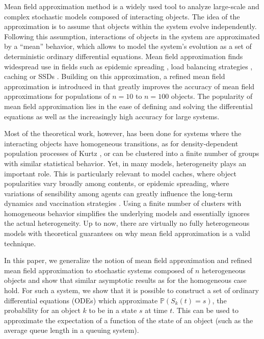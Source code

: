 \documentclass[acmsmall]{acmart}
\newcommand\Proba[1]{\mathbb{P}\left(#1\right)} %
\begin{document}
Mean field approximation method is a widely used tool to analyze large-scale and complex stochastic models composed of interacting objects. The idea of the approximation is to assume that objects within the system evolve independently. Following this assumption, interactions of objects in the system are approximated by a ``mean'' behavior, which allows to model the system's evolution as a set of deterministic ordinary differential equations. Mean field approximation finds widespread use in fields such as epidemic spreading \cite{montalbanHerdImmunityIndividual2020,dearrudaFundamentalsSpreadingProcesses2018}, load balancing strategies \cite{mukhopadhyayAnalysisLoadBalancing2015,mitzenmacherPowerTwoChoices2001}, caching \cite{gastTransientSteadystateRegime2015} or SSDs \cite{vanhoudtMeanFieldModel2013}. Building on this approximation, a refined mean field approximation is introduced in \cite{gastRefinedMeanField2017,gastSizeExpansionsMean2019} that greatly improves the accuracy of mean field approximations for populations of $n=10$ to $n=100$ objects. The popularity of mean field approximation lies in the ease of defining and solving the differential equations as well as the increasingly high accuracy for large systems. 

Most of the theoretical work, however, has been done for systems where the interacting objects have homogeneous transitions, as for density-dependent population processes of Kurtz \cite{kurtzStrongApproximationTheorems1978}, or can be clustered into a finite number of groups with similar statistical behavior. Yet, in many models, heterogeneity plays an important role. This is particularly relevant to model caches, where object popularities vary broadly among contents, or epidemic spreading, where variations of sensibility among agents can greatly influence the long-term dynamics and vaccination strategies \cite{gomesIndividualVariationSusceptibility2020}.  Using a finite number of clusters with homogeneous behavior simplifies the underlying models and essentially ignores the actual heterogeneity. Up to now, there are virtually no fully heterogeneous models with theoretical guarantees on why mean field approximation is a valid technique.

In this paper, we generalize the notion of mean field approximation and refined mean field approximation to stochastic systems composed of $n$  heterogeneous objects and show that similar asymptotic results as for the homogeneous case hold. For such a system, we show that it is possible to construct a set of ordinary differential equations (ODEs) which approximate $\Proba{S_k(t)=s}$, the probability for an object $k$ to be in a state $s$ at time $t$. {\color{myorange}This can be used to approximate the expectation of a function of the state of an object (such as the average queue length in a queuing system).}
\end{document}
